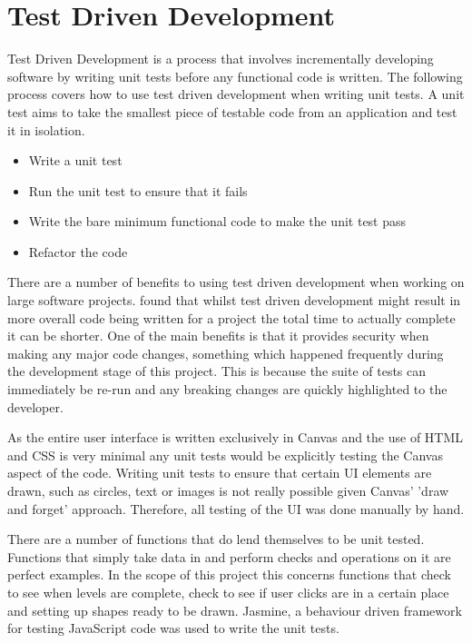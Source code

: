 \documentclass[12pt,a4paper]{report}
\begin{document}
\section{Test Driven Development}
Test Driven Development is a process that involves incrementally developing software by writing unit tests before any functional code is written. The following process covers how to use test driven development when writing unit tests. A unit test aims to take the smallest piece of testable code from an application and test it in isolation. 

\begin{itemize}
   \item Write a unit test
   \item Run the unit test to ensure that it fails
   \item Write the bare minimum functional code to make the unit test pass
   \item Refactor the code
\end{itemize}

   There are a number of benefits to using test driven development when working on large software projects. \cite{muller2003return} found that whilst test driven development might result in more overall code being written for a project the total time to actually complete it can be shorter. One of the main benefits is that it provides security when making any major code changes, something which happened frequently during the development stage of this project. This is because the suite of tests can immediately be re-run and any breaking changes are quickly highlighted to the developer.

As the entire user interface is written exclusively in Canvas and the use of HTML and CSS is very minimal any unit tests would be explicitly testing the Canvas aspect of the code. Writing unit tests to ensure that certain UI elements are drawn, such as circles, text or images is not really possible given Canvas' 'draw and forget' approach. Therefore, all testing of the UI was done manually by hand.

There are a number of functions that do lend themselves to be unit tested. Functions that simply take data in and perform checks and operations on it are perfect examples. In the scope of this project this concerns functions that check to see when levels are complete, check to see if user clicks are in a certain place and setting up shapes ready to be drawn. Jasmine, a behaviour driven framework for testing JavaScript code was used to write the unit tests.
\end{document}
